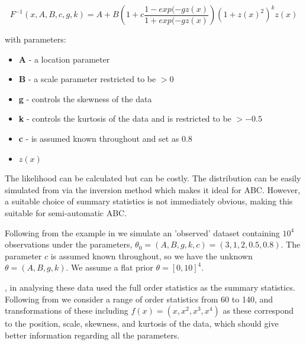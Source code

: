\documentclass[a4paper,10pt]{article}
\begin{document}
\begin{equation}
F^{-1}(x, A, B, c, g, k) = A + B\left(1 + c\frac{1-exp(-gz(x)}{1+exp(-gz(x)}\right)(1+z(x)^2)^kz(x)
\end{equation}

with parameters:
\begin{itemize}
\item \textbf{A} - a location parameter
\item \textbf{B} - a scale parameter restricted to be $>0$
\item \textbf{g} - controls the skewness of the data
\item \textbf{k} - controls the kurtosis of the data and is restricted to be $> - 0.5$
\item \textbf{c} - is assumed known throughout and set as 0.8
\item \textbf{$z(x)$}
\end{itemize}

The likelihood can be calculated but can be costly. The distribution can be easily simulated from via the inversion method which makes it ideal for ABC. However, a suitable choice of summary statistics is not immediately obvious, making this suitable for semi-automatic ABC.

Following from the example in \cite{Fearnhead2012} we simulate an 'observed' dataset containing $10^4$ observations under the parameters, $\theta_0 = (A, B, g, k, c) = (3, 1, 2, 0.5, 0.8)$. The parameter $c$ is assumed known throughout, so we have the unknown $\theta = (A, B, g, k)$. We assume a flat prior $\theta = [0, 10]^4$.

\cite{allingham2009}, in analysing these data used the full order statistics as the summary statistics. Following from \cite{Fearnhead2012} we consider a range of order statistics from 60 to 140, and transformations of these including $f(x) = (x, x^2, x^3, x^4)$ as these correspond to the position, scale, skewness, and kurtosis of the data, which should give better information regarding all the parameters.
\end{document}
